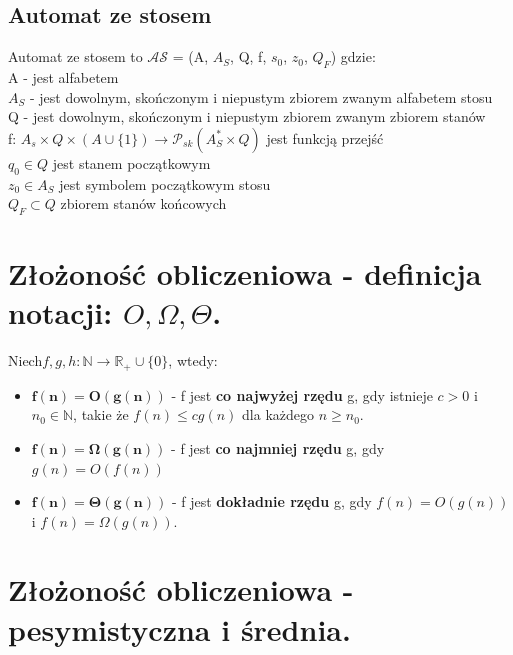 \documentclass[12pt]{article}
\begin{document}
    \subsection{Automat ze stosem}
    \begin{definition}
        Automat ze stosem to $\mathcal{AS}$ = (A, $A_{S}$, Q, f, $s_{0}$, $z_{0}$, $Q_{F}$) gdzie: \\
        A - jest alfabetem \\
        $A_{S}$ - jest dowolnym, skończonym i niepustym zbiorem zwanym alfabetem stosu \\
        Q - jest dowolnym, skończonym i niepustym zbiorem zwanym zbiorem stanów \\
        f: $A_{s} \times Q \times (A \cup \{1\}) \rightarrow \mathcal{P}_{sk}(A^{*}_{S} \times Q)$ jest funkcją przejść \\
        $q_{0} \in Q$ jest stanem początkowym \\
        $z_{0} \in A_{S}$ jest symbolem początkowym stosu \\
        $Q_{F} \subset Q$ zbiorem stanów końcowych
    \end{definition}

    \newpage

    \section{Złożoność obliczeniowa - definicja notacji: $O, \Omega, \Theta$.}
    \begin{definition}
        Niech$f, g, h: \mathbb{N} \rightarrow \mathbb{R}_{+} \cup \{0\}$, wtedy:
        \begin{itemize}
            \item $\mathbf{f(n) = O(g(n))}$ - f jest \textbf{co najwyżej rzędu} g, gdy istnieje $c > 0$ i
            $n_0 \in \mathbb{N}$, takie że $f(n)  \leq cg(n)$ dla każdego $n \geq n_0$.
            \item $\mathbf{f(n) = \Omega(g(n))}$ - f jest \textbf{co najmniej rzędu} g, gdy $g(n) = O(f(n))$
            \item $\mathbf{f(n) = \Theta(g(n))}$ - f jest \textbf{dokładnie rzędu} g, gdy $f(n) = O(g(n))$
            i $f(n) = \Omega(g(n))$.
        \end{itemize}
    \end{definition}

    \newpage

    \section{Złożoność obliczeniowa - pesymistyczna i średnia.}
\end{document}

